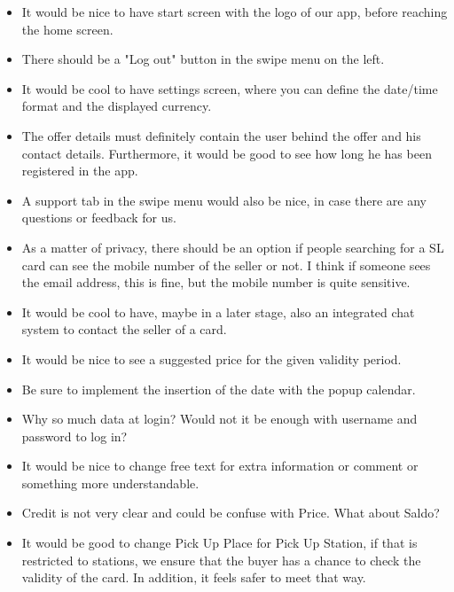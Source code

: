 \documentclass[11pt,twoside,a4paper]{report}
\begin{document}
\begin{itemize}

\item It would be nice to have start screen with the logo of our app, before reaching the home screen.

\item There should be a "Log out" button in the swipe menu on the left.

\item It would be cool to have settings screen, where you can define the date/time format and the displayed currency.

\item The offer details must definitely contain the user behind the offer and his contact details. Furthermore, it would be good to see how long he has been registered in the app.

\item A support tab in the swipe menu would also be nice, in case there are any questions or feedback for us.

\item As a matter of privacy, there should be an option if people searching for a SL card can see the mobile number of the seller or not. I think if someone sees the email address, this is fine, but the mobile number is quite sensitive.

\item It would be cool to have, maybe in a later stage, also an integrated chat system to contact the seller of a card.

\item It would be nice to see a suggested price for the given validity period.

\item Be sure to implement the insertion of the date with the popup calendar.

\item Why so much data at login? Would not it be enough with username and password to log in?

\item It would be nice to change free text for extra information or comment or something more understandable.

\item Credit is not very clear and could be confuse with Price. What about Saldo?

\item It would be good to change Pick Up Place for Pick Up Station, if that is restricted to stations, we ensure that the buyer has a chance to check the validity of the card. In addition, it feels safer to meet that way.

\end{itemize}
\end{document}
